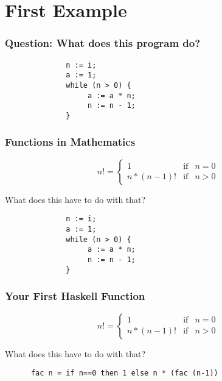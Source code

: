 \documentclass{beamer}
\begin{document}
\section{First Example}
\begin{frame}[fragile]
    \frametitle{Question: What does this program do? }
    


\begin{verbatim}
              n := i; 
              a := 1; 
              while (n > 0) { 
                   a := a * n; 
                   n := n - 1; 
              }
\end{verbatim}

\end{frame}

\begin{frame}[fragile]
    \frametitle{Functions in Mathematics}
    

\begin{displaymath}
n! = \left\{
     \begin{array}{lcl}
     1 &\mbox{if} & n=0
\\
     n * (n-1)!&\mbox{if} & n > 0
     \end{array}\right.
\end{displaymath}
\pause

What does this have to do with that? 
\begin{verbatim}
              n := i; 
              a := 1; 
              while (n > 0) { 
                   a := a * n; 
                   n := n - 1; 
              }
\end{verbatim}

\end{frame}

\begin{frame}[fragile]
    \frametitle{Your First Haskell Function}
    

\begin{displaymath}
n! = \left\{
     \begin{array}{lcl}
     1 &\mbox{if} & n=0
\\
     n * (n-1)!&\mbox{if} & n > 0
     \end{array}\right.
\end{displaymath}
\pause

What does this have to do with that? 
\begin{verbatim}
      fac n = if n==0 then 1 else n * (fac (n-1))
\end{verbatim}

\end{frame}
\end{document}
